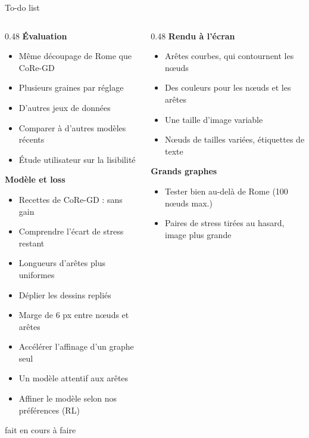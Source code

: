 \documentclass[aspectratio=169,11pt]{beamer}
\begin{document}
\begin{frame}{To-do list}
\newcommand{\afaire}{\item[\textcolor{bleu}{\faSquare[regular]}]}
\newcommand{\encours}{\item[\textcolor{orange}{\faMinusSquare[regular]}]}
\newcommand{\fait}{\item[\textcolor{vert}{\faCheckSquare[regular]}]}
\scriptsize
\begin{columns}[T]
\begin{column}{0.48\textwidth}
\textbf{Évaluation}
\begin{itemize}
\setlength{\itemsep}{0pt}
\fait Même découpage de Rome que CoRe-GD
\fait Plusieurs graines par réglage
\afaire D'autres jeux de données
\afaire Comparer à d'autres modèles récents
\afaire Étude utilisateur sur la lisibilité
\end{itemize}

\vspace{2pt}
\textbf{Modèle et loss}
\begin{itemize}
\setlength{\itemsep}{0pt}
\fait Recettes de CoRe-GD : sans gain
\encours Comprendre l'écart de stress restant
\afaire Longueurs d'arêtes plus uniformes
\afaire Déplier les dessins repliés
\encours Marge de 6 px entre nœuds et arêtes
\afaire Accélérer l'affinage d'un graphe seul
\afaire Un modèle attentif aux arêtes
\afaire Affiner le modèle selon nos préférences (RL)
\end{itemize}



\vspace{10pt}
\scriptsize\textcolor{gris}{\textcolor{vert}{\faCheckSquare[regular]} fait \quad \textcolor{orange}{\faMinusSquare[regular]} en cours \quad \textcolor{bleu}{\faSquare[regular]} à faire}

\end{column}
\begin{column}{0.48\textwidth}
\textbf{Rendu à l'écran}
\begin{itemize}
\setlength{\itemsep}{0pt}
\afaire Arêtes courbes, qui contournent les nœuds
\afaire Des couleurs pour les nœuds et les arêtes
\afaire Une taille d'image variable
\afaire Nœuds de tailles variées, étiquettes de texte
\end{itemize}

\vspace{2pt}
\textbf{Grands graphes}
\begin{itemize}
\setlength{\itemsep}{0pt}
\afaire Tester bien au-delà de Rome (100 nœuds max.)
\afaire Paires de stress tirées au hasard, image plus grande
\end{itemize}


\end{column}
\end{columns}
\end{frame}
\end{document}

